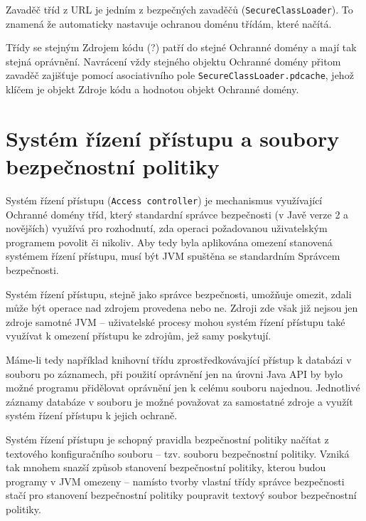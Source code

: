 Zavaděč tříd z URL je jedním z bezpečných zavaděčů ({\tt SecureClassLoader}). To znamená že automaticky nastavuje ochranou doménu třídám, které načítá.

Třídy se stejným Zdrojem kódu (?) patří do stejné Ochranné domény a mají tak stejná oprávnění. Navrácení vždy stejného objektu Ochranné domény přitom zavaděč zajišťuje pomocí asociativního pole {\tt SecureClassLoader.pdcache}, jehož klíčem je objekt Zdroje kódu a hodnotou objekt Ochranné domény. \cite{sourceSecureClassLoader}

\section{Systém řízení přístupu a soubory bezpečnostní politiky}

Systém řízení přístupu ({\tt Access controller}) je mechanismus využívající Ochranné domény tříd, který standardní správce bezpečnosti (v Javě verze 2 a novějších) využívá pro rozhodnutí, zda operaci požadovanou uživatelským programem povolit či nikoliv. Aby tedy byla aplikována omezení stanovená systémem řízení přístupu, musí být JVM spuštěna se standardním Správcem bezpečnosti. \cite[5]{oaks}

Systém řízení přístupu, stejně jako správce bezpečnosti, umožňuje omezit, zdali může být operace nad zdrojem provedena nebo ne. Zdroji zde však již nejsou jen zdroje samotné JVM -- uživatelské procesy mohou systém řízení přístupu také využívat k omezení přístupu ke zdrojům, jež samy poskytují. \cite[5]{oaks}

Máme-li tedy například knihovní třídu zprostředkovávající přístup k databázi v souboru po záznamech, při použití oprávnění jen na úrovni Java API by bylo možné programu přidělovat oprávnění jen k celému souboru najednou. Jednotlivé záznamy databáze v souboru je možné považovat za samostatné zdroje a využít systém řízení přístupu k jejich ochraně.

Systém řízení přístupu je schopný pravidla bezpečnostní politiky načítat z textového konfiguračního souboru -- tzv. souboru bezpečnostní politiky. Vzniká tak mnohem snazší způsob stanovení bezpečnostní politiky, kterou budou programy v JVM omezeny -- namísto tvorby vlastní třídy správce bezpečnosti stačí pro stanovení bezpečnostní politiky poupravit textový soubor bezpečnostní politiky. \cite[5]{oaks}

